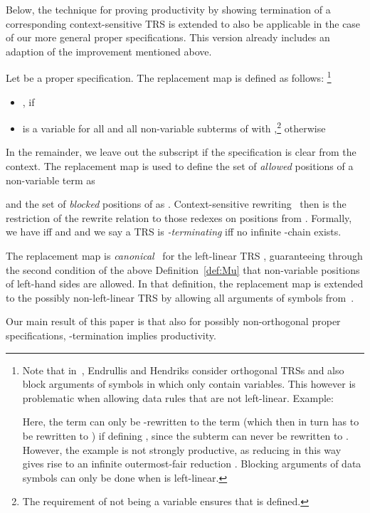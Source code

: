 \documentclass{eptcs}
\begin{document}
Below,
the technique for proving productivity by showing termination of a corresponding
context-sensitive TRS is extended
to also be applicable in the case of our more general proper specifications.
This version already includes an adaption of the improvement mentioned above.

\begin{definition}
\label{def:Mu}
Let  be a proper specification.
The replacement map 
is defined as follows:
\footnote{
Note that in~\cite{EH11}, Endrullis and Hendriks consider orthogonal TRSs and
also block arguments of symbols in  which only contain variables.
This however is problematic when allowing data rules that are not left-linear.
Example:

Here, the term  can
only be -rewritten to the term  (which then in turn has
to be rewritten to )
if defining , since the subterm
 can never be rewritten to . However, the
example is not strongly productive, as reducing in this way gives rise to an
infinite outermost-fair reduction
.
Blocking arguments of data symbols can only be done when  is
left-linear.
}
\begin{itemize}
\item
, if 

\item
 is a variable
        for all 
        and all non-variable subterms  of  with ,\footnote{
        The requirement of  not being a variable ensures that
         is defined.
    }
    otherwise
\end{itemize}
\end{definition}

In the remainder, we leave out the subscript  if the specification is
clear from the context. The replacement map  is used to define
the set of \emph{allowed} positions of a non-variable term  as

and the set of \emph{blocked} positions of  as
.
Context-sensitive rewriting~\cite{L98} then
is the restriction of the rewrite relation to those redexes on positions
from . Formally, we have  iff
 and  and we say a TRS  is
\emph{-terminating} iff no infinite -chain exists.

The replacement map  is \emph{canonical}~\cite{L02} for the
left-linear TRS , guaranteeing through the second condition of the above
Definition~\ref{def:Mu} that non-variable positions of left-hand
sides are allowed.
In that definition, the replacement map  is extended to the
possibly non-left-linear TRS  by allowing all arguments of
symbols from~.


Our main result of this paper is that also for possibly non-orthogonal proper
specifications, -termination implies productivity.
\end{document}
